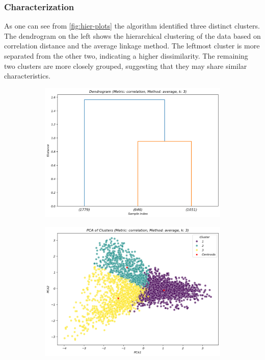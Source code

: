\subsubsection{Characterization}
As one can see from \autoref{fig:hier-plots} the algorithm identified three distinct clusters. The dendrogram on the left shows the hierarchical clustering of the data based on correlation distance and the average linkage method. The leftmost cluster is more separated from the other two, indicating a higher dissimilarity. The remaining two clusters are more closely grouped, suggesting that they may share similar characteristics.

\begin{figure}[H]
    \centering
    \begin{subfigure}[b]{0.33\textwidth}
        \includegraphics[width=\textwidth]{images/CLUSTER/hierarchical/dendogram.png}
    \end{subfigure}
    \begin{subfigure}[b]{0.33\textwidth}
        \includegraphics[width=\textwidth]{images/CLUSTER/hierarchical/pca.png}


\end{subfigure}
\end{figure}

